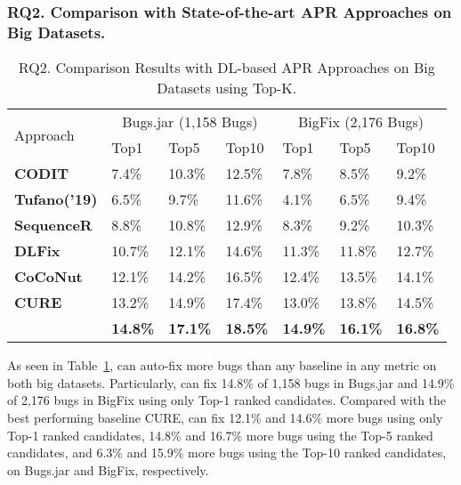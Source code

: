\subsubsection{\bf RQ2. Comparison with State-of-the-art APR Approaches on Big Datasets.}

\begin{table}[t]
	\caption{RQ2. Comparison Results with DL-based APR Approaches on Big Datasets using Top-K.}
	\vspace{-10pt}
	\begin{center}
		\renewcommand{\arraystretch}{1}
		\begin{tabular}{p{1.6cm}|p{0.7cm}|p{0.7cm}|p{0.7cm}|p{0.7cm}|p{0.7cm}|p{0.7cm}}\hline
			\multirow{2}{*}{Approach}&\multicolumn{3}{c|}{Bugs.jar (1,158 Bugs)}&\multicolumn{3}{c}{BigFix (2,176 Bugs)}\\\cline{2-7}
		                          & Top1   & Top5   & Top10  & Top1   & Top5   & Top10\\
			\hline
			\textbf{CODIT}        & 7.4\%  & 10.3\% & 12.5\% & 7.8\%  & 8.5\%  & 9.2\%\\
			\textbf{Tufano('19)}  & 6.5\%  & 9.7\%  & 11.6\% & 4.1\%  & 6.5\%  & 9.4\%\\
			\textbf{SequenceR}    & 8.8\%  & 10.8\% & 12.9\% & 8.3\%  & 9.2\%  & 10.3\%\\
			\textbf{DLFix}        & 10.7\% & 12.1\% & 14.6\% & 11.3\% & 11.8\% & 12.7\%\\
			\textbf{CoCoNut}      & 12.1\% & 14.2\% & 16.5\% & 12.4\% & 13.5\% & 14.1\%\\
			\textbf{CURE}         & 13.2\% & 14.9\% & 17.4\% & 13.0\% & 13.8\% & 14.5\%\\
			\hline
			\textbf{\tool}        & \textbf{14.8\%} & \textbf{17.1\%} & \textbf{18.5\%} & \textbf{14.9\%} & \textbf{16.1\%} & \textbf{16.8\%}\\
			\hline
		\end{tabular}
		\label{RQ2_results}
	\end{center}
\end{table}


As seen in Table~\ref{RQ2_results}, {\tool} can auto-fix more bugs than any baseline in any metric on both big datasets. 
Particularly, {\tool} can fix 14.8\% of 1,158 bugs in Bugs.jar and 14.9\% of 2,176 bugs in BigFix using only Top-1 ranked candidates. Compared with the best performing baseline CURE, {\tool} can 
fix 12.1\% and 14.6\% more bugs using only Top-1 ranked candidates,  14.8\% and 16.7\% more bugs using the Top-5 ranked candidates, and 6.3\% and 15.9\% more bugs using the Top-10 ranked candidates, on Bugs.jar and BigFix, respectively. 